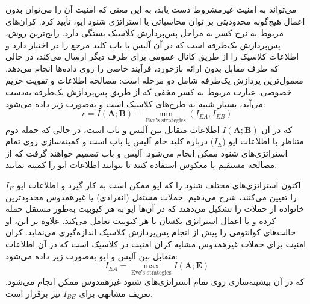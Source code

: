  می‌تواند به امنیت غیرمشروط دست یابد، به این معنی که امنیت آن را می‌توان بدون اعمال هیچ‌گونه محدودیتی بر توان محاسباتی یا استراتژی شنود ایو، تأیید کرد. کران‌های مربوط به نرخ کسر به مراحل پس‌پردازش کلاسیک بستگی دارد. رایج‌ترین روش، پس‌پردازش یک‌طرفه است که در آن آلیس یا باب کلید مرجع را در اختیار دارد و اطلاعات کلاسیک را از طریق کانال عمومی برای طرف دیگر ارسال می‌کند، در حالی که طرف مقابل بدون ارائه بازخورد، فرآیند خاصی را روی داده‌ها انجام می‌دهد. معمول‌ترین پردازش یک‌طرفه شامل دو مرحله است: مصالحه اطلاعات و تقویت حریم خصوصی. عبارت مربوط به کسر مخفی که از طریق پس‌پردازش یک‌طرفه به‌دست می‌آید، بسیار شبیه به طرح‌های  کلاسیک است و به‌صورت زیر داده می‌شود:
\begin{equation}
	r = I(\bm{A}; \bm{B}) - \min_{\text{Eve's strategies}} (I_{EA}, I_{EB})
	\label{eq:1-11}
\end{equation}
که در آن $I(\bm{A}; \bm{B})$ اطلاعات متقابل بین آلیس و باب است، در حالی که جمله دوم متناظر با اطلاعات ایو ($I_E$) درباره کلید خام آلیس یا باب است و کمینه‌سازی روی تمام استراتژی‌های شنود ممکن انجام می‌شود. آلیس و باب تصمیم خواهند گرفت که از مصالحه مستقیم یا معکوس استفاده کنند تا بتوانند اطلاعات ایو را کمینه نمایند.

اکنون استراتژی‌های مختلف شنود را که ایو ممکن است به کار گیرد و اطلاعات ایو $I_E$ را تعیین می‌کنند، شرح می‌دهیم. حملات مستقل (انفرادی) یا غیرهمدوس محدودترین خانواده از حملات را تشکیل می‌دهند که در آن‌ها ایو به هر کیوبیت به‌طور مستقل حمله کرده و با اعمال استراتژی یکسان با هر کیوبیت تعامل می‌کند. علاوه بر این، او حالت‌های کوانتومی را پیش از انجام پس‌پردازش کلاسیک اندازه‌گیری می‌نماید. کران امنیت برای حملات غیرهمدوس مشابه کران امنیت در  کلاسیک است که در آن اطلاعات متقابل بین آلیس و ایو به‌صورت زیر داده می‌شود:
\begin{equation}
	I_{EA} = \max_{\text{Eve's strategies}} I(\bm{A}; \bm{E})
	\label{eq:1-12}
\end{equation}
که در آن بیشینه‌سازی روی تمام استراتژی‌های شنود غیرهمدوس ممکن انجام می‌شود. تعریف مشابهی برای $I_{BE}$ نیز برقرار است.

